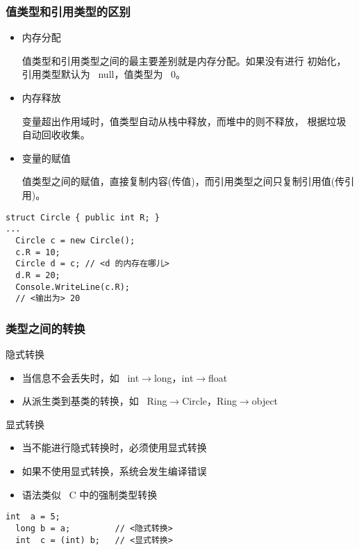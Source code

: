 
\begin{frame}[fragile]
\frametitle{值类型和引用类型的区别}

\begin{itemize}
\item 内存分配

  \CJKindent \small 值类型和引用类型之间的最主要差别就是内存分配。如果没有进行
  初始化，引用类型默认为 ~null，值类型为 ~0。
\pause
\item 内存释放

  \CJKindent \small 变量超出作用域时，值类型自动从栈中释放，而堆中的则不释放，
  根据垃圾自动回收收集。
\pause
\item 变量的赋值

  \CJKindent \small 值类型之间的赋值，直接复制内容({\redwarn 传值})，而引用类型之间只复制引用值({\redwarn 传引用})。
\pause
\end{itemize}
\begin{lstlisting}[escapeinside=<>]
struct Circle { public int R; }
...
  Circle c = new Circle();
  c.R = 10;
  Circle d = c; // <d 的内存在哪儿>
  d.R = 20;
  Console.WriteLine(c.R);
  // <输出为> 20

\end{lstlisting}

\end{frame}


\begin{frame}[fragile]
\frametitle{类型之间的转换}
\begin{block}{隐式转换}
  \begin{itemize}
  \item 当信息不会丢失时，如 ~int$\rightarrow$long，int$\rightarrow$float
  \item 从派生类到基类的转换，如 ~Ring$\rightarrow$Circle，Ring$\rightarrow$object
  \end{itemize}
\end{block}
\pause
\begin{block}{显式转换}
  \begin{itemize}
  \item 当不能进行隐式转换时，必须使用显式转换
  \item 如果不使用显式转换，系统会发生编译错误
  \item 语法类似 ~C 中的强制类型转换
  \end{itemize}
\end{block}
\pause
\begin{lstlisting}[escapeinside=<>]
  int  a = 5;
  long b = a;         // <隐式转换>
  int  c = (int) b;   // <显式转换>

\end{lstlisting}
\end{frame}

